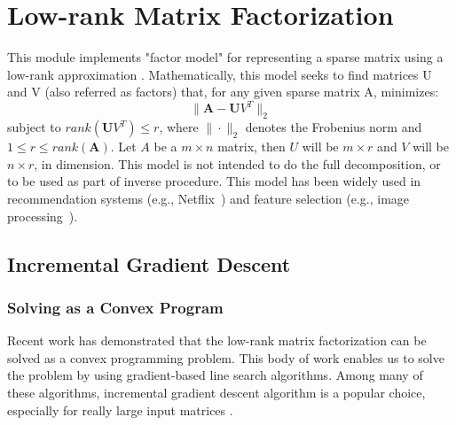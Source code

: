 
\chapter{Low-rank Matrix Factorization}

This module implements "factor model" for representing a sparse matrix
using a low-rank approximation \cite{DBLP:conf/icml/SrebroJ03}.
Mathematically, this model seeks to find matrices U and V (also referred 
as factors) that, for any given sparse matrix A, minimizes:
\[ \|\boldsymbol A - \boldsymbol UV^{T} \|_2 \]
subject to $rank(\boldsymbol UV^{T}) \leq r$, where $\|\cdot\|_2$ denotes
the Frobenius norm and $1 \leq r \leq rank(\boldsymbol A)$.
Let $A$ be a $m \times n$ matrix, then $U$ will be $m \times r$ and $V$
will be $n \times r$, in dimension.
This model is not intended to do the full decomposition, or to be used as
part of inverse procedure.
This model has been widely used in recommendation systems (e.g., Netflix~\cite{:TheNetflixPrize07}) and feature selection (e.g., image processing~\cite{DBLP:conf/nips/WrightGRPM09}).

\section{Incremental Gradient Descent}

\subsection{Solving as a Convex Program}
Recent work
\cite{DBLP:journals/cacm/CandesR12, DBLP:journals/siamrev/RechtFP10}
has demonstrated that the low-rank matrix factorization can be solved as
a convex programming problem.
This body of work enables us to solve the problem by using gradient-based
line search algorithms.
Among many of these algorithms, incremental gradient descent algorithm is
a popular choice, especially for really large input matrices
\cite{DBLP:conf/sigmod/FengKRR12, DBLP:conf/kdd/GemullaNHS11}.

